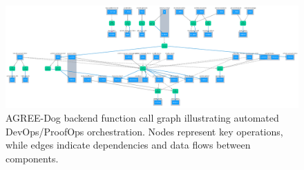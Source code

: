 

\begin{figure}[t]
  \centering
  \includegraphics[height=0.6\textwidth, width=1.0\textwidth]{backend-callgraph.png}
  \caption{AGREE-Dog backend function call graph illustrating automated DevOps/ProofOps orchestration. Nodes represent key operations, while edges indicate dependencies and data flows between components.}
  \label{fig:callgraph}
\end{figure}





